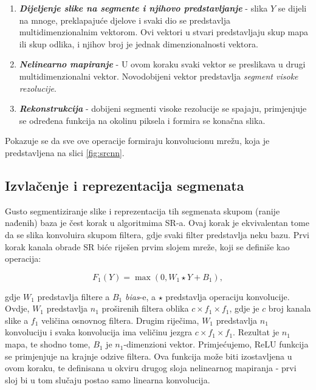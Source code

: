 \documentclass[12pt]{report}
\numberwithin{equation}{section}
\begin{document}
\begin{enumerate}

 \item \textbf{\textit{Dijeljenje slike na segmente i njihovo predstavljanje}} - slika $Y$ se dijeli na mnoge, preklapajuće djelove i svaki dio se predstavlja multidimenzionalnim vektorom. Ovi vektori u stvari predstavljaju skup mapa ili skup odlika, i njihov broj je jednak dimenzionalnosti vektora. 
  
 \item \textbf{\textit{Nelinearno mapiranje}} - U ovom koraku svaki vektor se preslikava u drugi multidimenzionalni vektor. Novodobijeni vektor predstavlja \textit{segment visoke rezolucije}.
  
 \item \textbf{\textit{Rekonstrukcija}} - dobijeni segmenti visoke rezolucije se spajaju, primjenjuje se određena funkcija na okolinu piksela i formira se konačna slika. 

\end{enumerate}
Pokazuje se da sve ove operacije formiraju konvolucionu mrežu, koja je predstavljena na slici \ref{fig:srcnn}.


\subsection{Izvlačenje i reprezentacija segmenata}


Gusto segmentiziranje slike i reprezentacija tih segmenata skupom (ranije nađenih) baza je čest korak u algoritmima SR-a. Ovaj korak je ekvivalentan tome da se slika konvoluira skupom filtera, gdje svaki filter predstavlja neku bazu. Prvi korak kanala obrade SR biće riješen prvim slojem mreže, koji se definiše kao operacija:


\begin{equation}
  F_1(Y) = \max(0, W_1 \star Y + B_1),
\end{equation}

gdje $W_1$ predstavlja filtere a $B_1$ \textit{bias}-e, a $\star$ predstavlja operaciju konvolucije. Ovdje, $W_1$ predstavlja $n_1$ proširenih filtera oblika $c \times f_1 \times f_1$, gdje je $c$ broj kanala slike a $f_1$ veličina osnovnog filtera. Drugim riječima, $W_1$ predstavlja $n_1$ konvoluciju i svaka konvolucija ima veličinu jezgra $c \times f_1 \times f_1$. Rezultat je $n_1$ mapa, te shodno tome, $B_1$ je $n_1$-dimenzioni vektor. Primjećujemo, ReLU funkcija se primjenjuje na krajnje odzive filtera.  Ova funkcija može biti izostavljena u ovom koraku, te definisana u okviru drugog sloja nelinearnog mapiranja - prvi sloj bi u tom slučaju postao samo linearna konvolucija.
\end{document}
